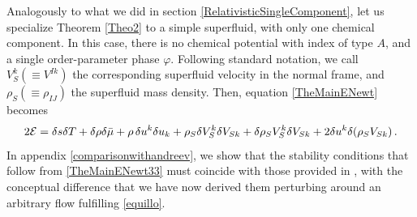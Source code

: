 \documentclass[a4paper, amsfonts, amssymb, amsmath, reprint, showkeys, nofootinbib, twoside,notitlepage,onecolumn]{revtex4-2}
\theoremstyle{definition}
\theoremstyle{theorem}
\theoremstyle{corollary}
\begin{document}
Analogously to what we did in section \ref{RelativisticSingleComponent}, let us specialize Theorem \ref{Theo2} to a simple superfluid, with only one chemical component. In this case, there is no chemical potential with index of type $A$, and a single order-parameter phase $\varphi$. Following standard notation, we call $V_S^k (\equiv V^{Ik})$ the corresponding superfluid velocity in the normal frame, and $\rho_S(\equiv \rho_{IJ})$ the superfluid mass density. Then, equation \eqref{TheMainENewt} becomes
\begin{equation}\label{TheMainENewt33}
2\mathcal{E}= \delta s \delta T +\delta \rho \delta \Bar{\mu}+ \rho\,\delta u^k \delta u_k +\rho_S \delta V^{k}_S\delta V_{Sk}  +\delta \rho_S V^{k}_S\delta V_{Sk} +2 \delta u^k   \delta ( \rho_S V_{Sk})  \, .
\end{equation}
In appendix \ref{comparisonwithandreev}, we show that the stability conditions that follow from \eqref{TheMainENewt33} must coincide with those provided in \cite{Andreev2004}, with the conceptual difference that we have now derived them perturbing around an arbitrary flow fulfilling \eqref{equillo}.
\end{document}
